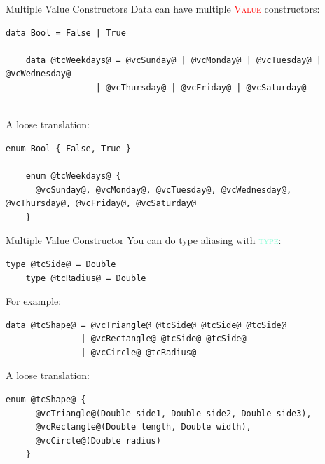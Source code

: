 \documentclass[xcolor={usenames,dvipsnames}]{beamer}
\newcommand{\hkeyword}[1]{\textcolor{Aquamarine}{\textsc{#1}}}
\newcommand{\hvalcon}[1]{\textcolor{Red}{\textsc{#1}}}
\begin{document}
\begin{frame}[fragile]{Multiple Value Constructors}
  Data can have multiple \hvalcon{Value} constructors:
  \begin{lstlisting}[style=hask]
    data Bool = False | True

    data @tcWeekdays@ = @vcSunday@ | @vcMonday@ | @vcTuesday@ | @vcWednesday@
                  | @vcThursday@ | @vcFriday@ | @vcSaturday@
  \end{lstlisting}

  \ \\
  \pause
  A loose translation:
  \begin{lstlisting}[style=hask]
    enum Bool { False, True }

    enum @tcWeekdays@ {
      @vcSunday@, @vcMonday@, @vcTuesday@, @vcWednesday@, @vcThursday@, @vcFriday@, @vcSaturday@
    }
  \end{lstlisting}
\end{frame}

\begin{frame}[fragile]{Multiple Value Constructor}
  You can do type aliasing with \hkeyword{type}:
  \begin{lstlisting}[style=hask]
    type @tcSide@ = Double
    type @tcRadius@ = Double
  \end{lstlisting}

  \pause
  For example:
  \begin{lstlisting}[style=hask]
    data @tcShape@ = @vcTriangle@ @tcSide@ @tcSide@ @tcSide@
               | @vcRectangle@ @tcSide@ @tcSide@
               | @vcCircle@ @tcRadius@
  \end{lstlisting}

  \pause
  A loose translation:
  \begin{lstlisting}[style=hask]
    enum @tcShape@ {
      @vcTriangle@(Double side1, Double side2, Double side3),
      @vcRectangle@(Double length, Double width),
      @vcCircle@(Double radius)
    }
  \end{lstlisting}
\end{frame}
\end{document}
